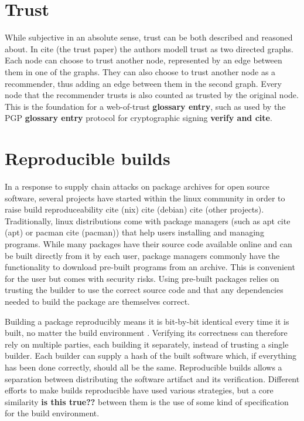 \documentclass[english, biblatex, digitaloutput]{kththesis}
\begin{document}

\section{Trust}

While subjective in an absolute sense, trust can be both described and reasoned about. In cite (the trust paper) the authors modell trust as two directed graphs. Each node can choose to trust another node, represented by an edge between them in one of the graphs. They can also choose to trust another node as a recommender, thus adding an edge between them in the second graph. Every node that the recommender trusts is also counted as trusted by the original node. This is the foundation for a web-of-trust \textbf{glossary entry}, such as used by the PGP \textbf{glossary entry} protocol for cryptographic signing \textbf{verify and cite}.

\section{Reproducible builds}

In a response to supply chain attacks on package archives for open source software, several projects have started within the linux community in order to raise build reproduceability cite (nix) cite (debian) cite (other projects). Traditionally, linux distributions come with package managers (such as apt cite (apt) or pacman cite (pacman)) that help users installing and managing programs. While many packages have their source code available online and can be built directly from it by each user, package managers commonly have the functionality to download pre-built programs from an archive. This is convenient for the user but comes with security risks. Using pre-built packages relies on trusting the builder to use the correct source code and that any dependencies needed to build the package are themselves correct.

Building a package reproducibly means it is bit-by-bit identical every time it is built, no matter the build environment \cite{lamb_reproducible_2021}. Verifying its correctness can therefore rely on multiple parties, each building it separately, instead of trusting a single builder. Each builder can supply a hash of the built software which, if everything has been done correctly, should all be the same. Reproducible builds allows a separation between distributing the software artifact and its verification. Different efforts to make builds reproducible have used various strategies, but a core similarity \textbf{is this true??} between them is the use of some kind of specification for the build environment.
\end{document}
